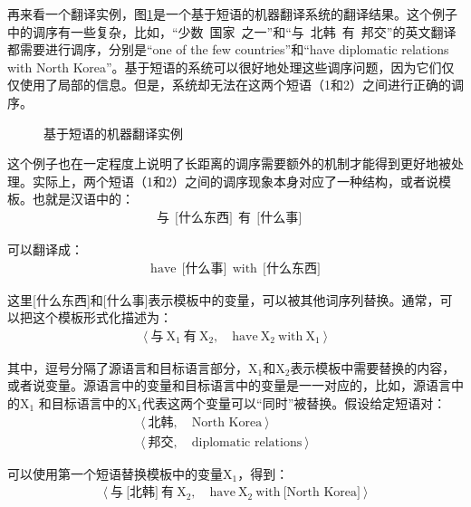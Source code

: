\parinterval 再来看一个翻译实例\cite{Chiang2012Hope}，图\ref{fig:4-31}是一个基于短语的机器翻译系统的翻译结果。这个例子中的调序有一些复杂，比如，``少数\ 国家\ 之一''和``与\ 北韩\ 有\ 邦交''的英文翻译都需要进行调序，分别是``one of the few countries''和``have diplomatic relations with North Korea''。基于短语的系统可以很好地处理这些调序问题，因为它们仅仅使用了局部的信息。但是，系统却无法在这两个短语（1和2）之间进行正确的调序。

\begin{figure}[htp]
\centering

\caption{基于短语的机器翻译实例\cite{Chiang2012Hope}}
\label{fig:4-31}
\end{figure}

\parinterval 这个例子也在一定程度上说明了长距离的调序需要额外的机制才能得到更好地被处理。实际上，两个短语（1和2）之间的调序现象本身对应了一种结构，或者说模板。也就是汉语中的：
\begin{eqnarray}
\text{与}\ \ \text{[什么东西]}\ \ \text{有}\ \ \text{[什么事]} \quad \nonumber
\end{eqnarray}

\parinterval 可以翻译成：
\begin{eqnarray}
\textrm{have}\ \ \text{[什么事]}\ \ \textrm{with}\ \ \text{[什么东西]} \nonumber
\end{eqnarray}

\parinterval 这里[什么东西]和[什么事]表示模板中的变量，可以被其他词序列替换。通常，可以把这个模板形式化描述为：
\begin{eqnarray}
\langle \ \text{与}\ \textrm{X}_1\ \text{有}\ \textrm{X}_2,\quad \textrm{have}\ \textrm{X}_2\ \textrm{with}\ \textrm{X}_1\ \rangle \nonumber
\end{eqnarray}

\noindent 其中，逗号分隔了源语言和目标语言部分，$\textrm{X}_1$和$\textrm{X}_2$表示模板中需要替换的内容，或者说变量。源语言中的变量和目标语言中的变量是一一对应的，比如，源语言中的$\textrm{X}_1$ 和目标语言中的$\textrm{X}_1$代表这两个变量可以``同时''被替换。假设给定短语对：
\begin{eqnarray}
\langle \ \text{北韩},\quad \textrm{North Korea} \ \rangle \qquad\ \quad\quad\ \  \nonumber \\
\langle \ \text{邦交},\quad \textrm{diplomatic relations} \ \rangle\quad\ \ \ \nonumber
\end{eqnarray}

\parinterval 可以使用第一个短语替换模板中的变量$\textrm{X}_1$，得到：
\begin{eqnarray}
\langle \ \text{与}\ \text{[北韩]}\ \text{有}\ \textrm{X}_2,\quad \textrm{have}\ \textrm{X}_2\ \textrm{with}\ \textrm{[North Korea]} \ \rangle \nonumber
\end{eqnarray}

